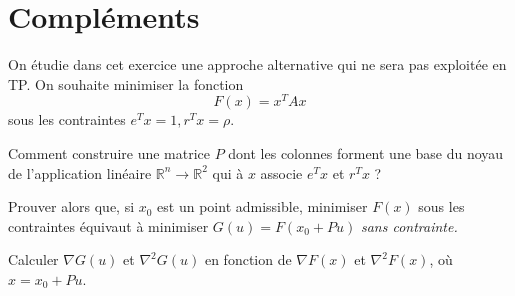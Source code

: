 \documentclass[10pt,a4paper,fleqn]{report}
\newcommand{\R}{\mathbb R}
\newcommand{\grad}{\nabla}
\newcommand{\hess}{\nabla^2}
\newcommand{\on}{\begin{displaymath}}
\newcommand{\off}{\end{displaymath}}
\begin{document}
\section{Compléments}
\begin{exercice}
  On étudie dans cet exercice une approche alternative qui ne sera pas
  exploitée en TP. On souhaite minimiser la fonction \on F(x)=x^T A x
  \off sous les contraintes $e^{T} x=1, r^{T}x = \rho$.
\begin{questions}
\item Comment construire une matrice $P$ dont les colonnes forment une
  base du noyau de l'application lin\'eaire $\R^{n} \to \R^{2}$ qui
  \`a $x$ associe $e^{T} x$ et $r^{T} x$ ?
\item Prouver alors que, si $x_{0}$ est un point admissible, minimiser
  $F(x)$ sous les contraintes \'equivaut \`a minimiser $G(u)=F(x_0+P
  u)$ \it sans \rm contrainte.
\item Calculer $\grad G(u)$ et $\hess G(u)$ en fonction de $\grad
  F(x)$ et $\hess F(x)$, o\`u $x=x_0 + P u$.
\end{questions}
\end{exercice}
\end{document}
